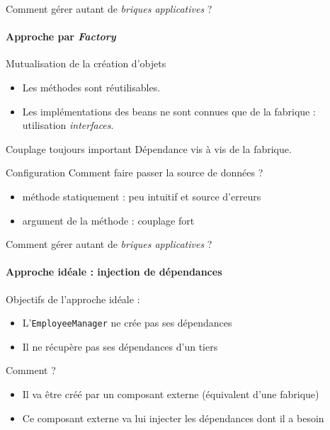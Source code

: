 \documentclass[compress]{beamer}%
\begin{document}
\begin{frame}{Comment gérer autant de \emph{briques applicatives} ?}
	\framesubtitle{Approche par \emph{Factory}}

	\begin{exampleblock}{Mutualisation de la création d'objets}
	\begin{itemize}[<+->]
	\item Les méthodes sont réutilisables.
	\item Les implémentations des beans ne sont connues que de la fabrique : utilisation \emph{interfaces}.
	\end{itemize}
	\end{exampleblock}
	
	\pause
	\begin{alertblock}{Couplage toujours important}
	Dépendance vis à vis de la fabrique.
	\end{alertblock}
	
	\pause
	\begin{alertblock}{Configuration}
	Comment faire passer la source de données ? 	
	\begin{itemize}[<+->]
	\item méthode statiquement : peu intuitif et source d'erreurs
	\item argument de la méthode : couplage fort
	\end{itemize}
	\end{alertblock}
\end{frame}


\begin{frame}{Comment gérer autant de \emph{briques applicatives} ?}
	\framesubtitle{Approche idéale : injection de dépendances}

	Objectifs de l'approche idéale :
	\begin{itemize}
	\item L'\texttt{EmployeeManager} ne crée pas ses dépendances
	\item Il ne récupère pas ses dépendances d'un tiers
	\end{itemize}
	
	\pause
	Comment ?
	\begin{itemize}
	\item Il va être créé par un composant externe (équivalent d'une fabrique)
	\item Ce composant externe va lui injecter les dépendances dont il a besoin
	\end{itemize}
	
\end{frame}
\end{document}
